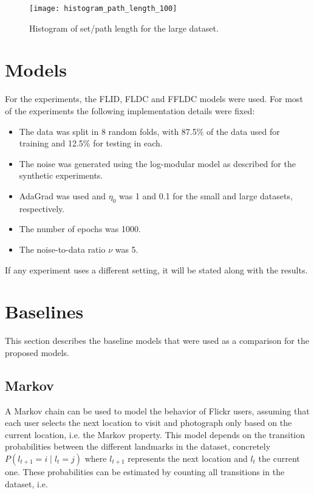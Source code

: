 \begin{figure}
  \centering
  \texttt{[image: histogram\_path\_length\_100]}
  \caption{Histogram of set/path length for the large dataset.}
  \label{fig:histogram_path_length_100}
\end{figure}

\section{Models}

For the experiments, the FLID, FLDC and FFLDC models were used. For most of the experiments the following implementation details were fixed:

\begin{itemize}
  \item The data was split in 8 random folds, with 87.5\% of the data used for training and 12.5\% for testing in each.
  \item The noise was generated using the log-modular model as described for the synthetic experiments.
  \item AdaGrad was used and $\eta_{0}$ was 1 and 0.1 for the small and large datasets, respectively.
  \item The number of epochs was 1000.
  \item The noise-to-data ratio $\nu$ was 5.
\end{itemize}

If any experiment uses a different setting, it will be stated along with the results.

\section{Baselines}
\label{sec:baselines}

This section describes the baseline models that were used as a comparison for the proposed models.

\subsection{Markov}

A Markov chain can be used to model the behavior of Flickr users, assuming that each user selects the next location to visit and photograph only based on the current location, i.e. the Markov property. This model depends on the transition probabilities between the different landmarks in the dataset, concretely $P(l_{t+1} = i \mid l_{t} = j)$ where $l_{t+1}$ represents the next location and $l_{t}$ the current one. These probabilities can be estimated by counting all transitions in the dataset, i.e.


